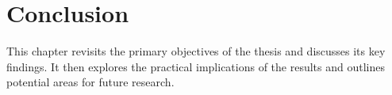 \chapter{Conclusion}
\label{chap:Conclusion}
This chapter revisits the primary objectives of the thesis and discusses its key findings. It then explores the practical implications of the results and outlines potential areas for future research.



